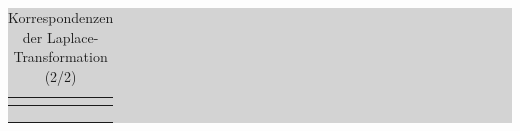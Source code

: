 \begin{table}[H]
{\begin{tabular}{| c | c | c | c |}
\parbox[c][0.5in][c]{0.3in}{} &
\parbox[c][0.5in][c]{2.4in}{} & 
\parbox[c][0.5in][c]{1.2in}{} & 
\parbox[c][0.5in][c]{2.4in}{}\\
\hline

\end{tabular}%
}
\label{tab:fourthree}
\end{table}

\clearpage

\begin{table}[H]
\setlength{\arrayrulewidth}{.1em}
\caption{Korrespondenzen der Laplace-Transformation (2/2)}
\setlength{\fboxsep}{0pt}%
\colorbox{lightgray}{%
%
\begin{tabular}{| c | c | c | c |}
\hline
\parbox[c][0.3in][c]{0.3in}{\smallskip\centering\textbf{\selectfont{Nr}}} &
\parbox[c][0.5in][c]{2.4in}{\smallskip\centering\textbf{\selectfont{Zeitfunktion x(t)}}} & \parbox[c][0.5in][c]{1.2in}{\smallskip\centering\textbf{\selectfont{Konvergenz-\\bereich}}} &
\parbox[c][0.5in][c]{2.4in}{\smallskip\centering\textbf{\selectfont{Laplace-Transformierte X(s)}}}\\ \hline

\parbox[c][0.5in][c]{0.3in}{} &
\parbox[c][0.5in][c]{2.4in}{} & 
\parbox[c][0.5in][c]{1.2in}{} & 
\parbox[c][0.5in][c]{2.4in}{}\\
\hline

\parbox[c][0.5in][c]{0.3in}{} &
\parbox[c][0.5in][c]{2.4in}{} & 
\parbox[c][0.5in][c]{1.2in}{} & 
\parbox[c][0.5in][c]{2.4in}{}\\
\hline

\parbox[c][0.5in][c]{0.3in}{} &
\parbox[c][0.5in][c]{2.4in}{} & 
\parbox[c][0.5in][c]{1.2in}{} & 
\parbox[c][0.5in][c]{2.4in}{}\\
\hline


\end{tabular}}
\end{table}
